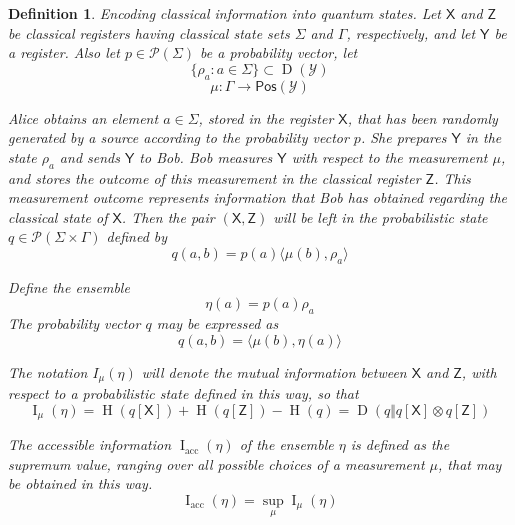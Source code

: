 \documentclass[aps,pra,onecolumn,notitlepage,superscriptaddress]{revtex4-1}
\newcommand{\reg}[1]{\mathsf{#1}}
\newcommand{\spc}[1]{\mathcal{#1}}
\newcommand{\Pos}{\mathsf{Pos}}
\def\>{\rangle}
\def\<{\langle}
\newcommand{\op}[1]{\operatorname{#1}}
\newtheorem{defi}{Definition}
\begin{document}
    \begin{defi}
        Encoding classical information into quantum states. Let $\reg X$ and $\reg Z$ be classical registers having classical state sets $\Sigma$ and $\Gamma$, respectively, and let $\reg Y$ be a register. Also let $p \in \spc P(\Sigma)$ be a probability vector, let
        \begin{equation}
            \{ \rho_a : a \in \Sigma \} \subset \op D(\spc Y)
        \end{equation}
        \begin{equation}
            \mu : \Gamma \to \Pos(\spc Y)
        \end{equation}

        Alice obtains an element $a \in \Sigma$, stored in the register $\reg X$, that has been randomly generated by a source according to the probability vector $p$. She prepares $\reg Y$ in the state $\rho_a$ and sends $\reg Y$ to Bob. Bob measures $\reg Y$ with respect to the measurement $\mu$, and stores the outcome of this measurement in the classical register $\reg Z$. This measurement outcome represents information that Bob has obtained regarding the classical state of $\reg X$. Then  the pair $(\reg X,\reg Z)$ will be left in the probabilistic state $q \in \spc P(\Sigma \times \Gamma)$ defined by
        \begin{equation}
            q(a,b) = p(a) \< \mu(b), \rho_a \>
        \end{equation}

        Define the ensemble
        \begin{equation}
            \eta(a) = p(a) \rho_a
        \end{equation}
        The probability vector $q$ may be expressed as
        \begin{equation}
            q(a,b) = \< \mu(b), \eta(a) \>
        \end{equation}

        The notation $I_{\mu}(\eta)$ will denote the mutual information between $\reg X$ and $\reg Z$, with respect to a probabilistic state defined in this way, so that
        \begin{equation}
            \op I_{\mu}(\eta) = \op H(q[\reg X]) + \op H(q[\reg Z]) - \op H(q) = \op D(q \Vert q[\reg X] \otimes q[\reg Z])
        \end{equation}

        The accessible information $\op I_{\text{acc}}(\eta)$ of the ensemble $\eta$ is defined as the supremum value, ranging over all possible choices of a measurement $\mu$, that may be obtained in this way.
        \begin{equation}
            \op I_{\text{acc}}(\eta) = \sup_{\mu} \op I_{\mu}(\eta)
        \end{equation}
    \end{defi}
\end{document}
